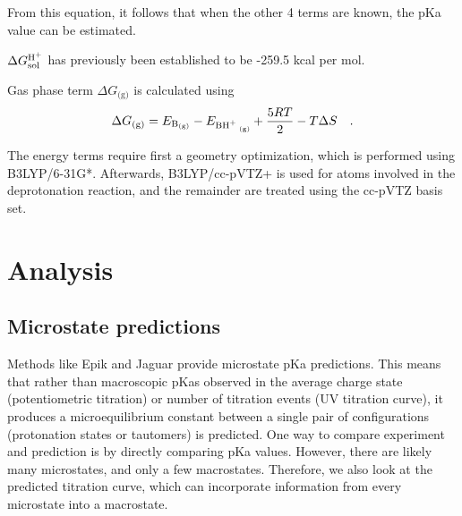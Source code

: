 \documentclass[9pt,lineno,final]{elife}
\begin{document}
From this equation, it follows that when the other 4 terms are known,
the pKa value can be estimated.

$\Delta G^\textrm{\ce{H+}}_\textrm{sol}$ has previously been established to be -259.5 kcal per mol\cite{Lim1991protonsolvation}.


Gas phase term $\Delta G_\textrm{(g)}$ is calculated using
%
\begin{equation}
 \Delta G_\textrm{(g)} = E_\textrm{\ce{B_{(g)}}} - E_\textrm{\ce{BH+ _{(g)}}} + \frac{5RT}{2 } - T \Delta S \quad .
\end{equation}


The energy terms require first a geometry optimization, which is performed using B3LYP/6-31G*. 
%
Afterwards, B3LYP/cc-pVTZ+ is used for atoms involved in the deprotonation reaction, and the remainder are treated using the cc-pVTZ basis set.
%


\section{Analysis}

\subsection{Microstate predictions}

Methods like Epik and Jaguar provide microstate pKa predictions.
%
This means that rather than macroscopic pKas observed in the average charge state (potentiometric titration) or number of titration events (UV titration curve), it produces a microequilibrium constant between a single pair of configurations (protonation states or tautomers) is predicted. 
%
One way to compare experiment and prediction is by directly comparing 
pKa values.
%
However, there are likely many microstates, and only a few macrostates.
%
Therefore, we also look at the predicted titration curve, which can incorporate information from every microstate into a macrostate.
\end{document}
